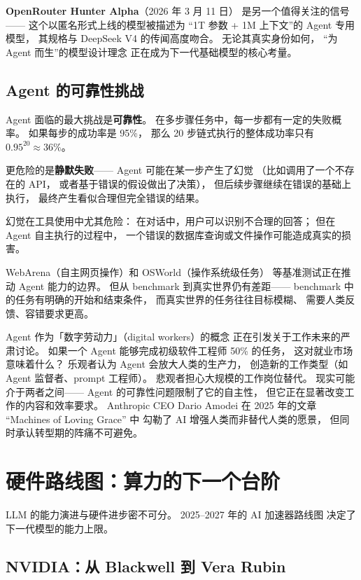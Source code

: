 \textbf{OpenRouter Hunter Alpha}（2026 年 3 月 11 日）
是另一个值得关注的信号——
这个以匿名形式上线的模型被描述为
``1T 参数 + 1M 上下文''的 Agent 专用模型，
其规格与 DeepSeek V4 的传闻高度吻合。
无论其真实身份如何，
``为 Agent 而生''的模型设计理念
正在成为下一代基础模型的核心考量。

\subsection{Agent 的可靠性挑战}

Agent 面临的最大挑战是\textbf{可靠性}。
在多步骤任务中，每一步都有一定的失败概率。
如果每步的成功率是 95\%，
那么 20 步链式执行的整体成功率只有 $0.95^{20} \approx 36\%$。

更危险的是\textbf{静默失败}——
Agent 可能在某一步产生了幻觉
（比如调用了一个不存在的 API，
或者基于错误的假设做出了决策），
但后续步骤继续在错误的基础上执行，
最终产生看似合理但完全错误的结果。

幻觉在工具使用中尤其危险：
在对话中，用户可以识别不合理的回答；
但在 Agent 自主执行的过程中，
一个错误的数据库查询或文件操作可能造成真实的损害。

WebArena（自主网页操作）和 OSWorld（操作系统级任务）
等基准测试正在推动 Agent 能力的边界。
但从 benchmark 到真实世界仍有差距——
benchmark 中的任务有明确的开始和结束条件，
而真实世界的任务往往目标模糊、
需要人类反馈、容错要求更高。

\begin{warnbox}
Agent 作为「数字劳动力」（digital workers）的概念
正在引发关于工作未来的严肃讨论。
如果一个 Agent 能够完成初级软件工程师 50\% 的任务，
这对就业市场意味着什么？
乐观者认为 Agent 会放大人类的生产力，
创造新的工作类型（如 Agent 监督者、prompt 工程师）。
悲观者担心大规模的工作岗位替代。
现实可能介于两者之间——
Agent 的可靠性问题限制了它的自主性，
但它正在显著改变工作的内容和效率要求。
Anthropic CEO Dario Amodei 在 2025 年的文章
``Machines of Loving Grace'' 中
勾勒了 AI 增强人类而非替代人类的愿景，
但同时承认转型期的阵痛不可避免。
\end{warnbox}

\section{硬件路线图：算力的下一个台阶}
\label{sec:hardware-roadmap}

LLM 的能力演进与硬件进步密不可分。
2025--2027 年的 AI 加速器路线图
决定了下一代模型的能力上限。

\subsection{NVIDIA：从 Blackwell 到 Vera Rubin}

